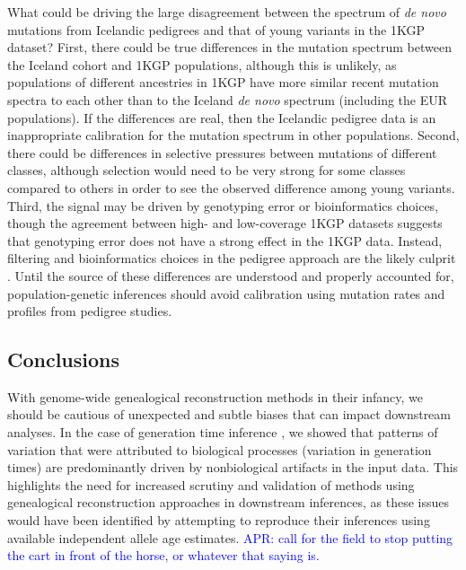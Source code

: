 \documentclass[]{article}
\newcommand{\aprcomment}[1]{{\textcolor{blue}{APR: #1}}}
\begin{document}
What could be driving the large disagreement between the spectrum of \emph{de
novo} mutations from Icelandic pedigrees and that of young variants in the 1KGP
dataset? First, there could be true differences in the mutation spectrum
between the Iceland cohort and 1KGP populations, although this is unlikely, as
populations of different ancestries in 1KGP have more similar recent mutation
spectra to each other than to the Iceland \emph{de novo} spectrum (including
the EUR populations). If the differences are real, then the Icelandic pedigree
data is an inappropriate calibration for the mutation spectrum in other
populations. Second, there could be differences in selective pressures between
mutations of different classes, although selection would need to be very strong
for some classes compared to others in order to see the observed difference
among young variants. Third, the signal may be driven by genotyping error or
bioinformatics choices, though the agreement between high- and low-coverage
1KGP datasets suggests that genotyping error does not have a strong effect in
the 1KGP data. Instead, filtering and bioinformatics choices in the pedigree
approach are the likely culprit \citep{bergeron2022mutationathon}. Until the
source of these differences are understood and properly accounted for,
population-genetic inferences should avoid calibration using mutation rates and
profiles from pedigree studies.

\subsection*{Conclusions}

With genome-wide genealogical reconstruction methods in their infancy, we
should be cautious of unexpected and subtle biases that can impact downstream
analyses. In the case of generation time inference \citep{wang2023human}, we
showed that patterns of variation that were attributed to biological processes
(variation in generation times) are predominantly driven by nonbiological
artifacts in the input data. This highlights the need for increased scrutiny
and validation of methods using genealogical reconstruction approaches in
downstream inferences, as these issues would have been identified by attempting
to reproduce their inferences using available independent allele age estimates.
\aprcomment{call for the field to stop putting the cart in front of the horse,
or whatever that saying is.}



\end{document}
